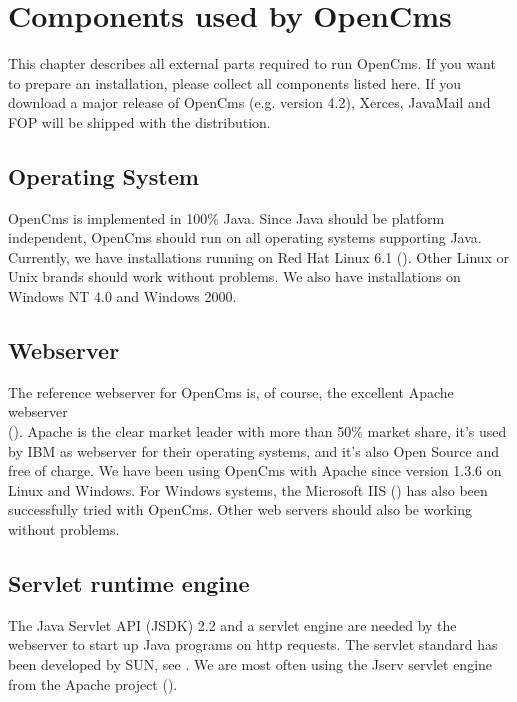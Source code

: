 \chapter{Components used by OpenCms}
\label{components}

This chapter describes all external parts required to run OpenCms.
If you want to prepare an installation, please collect all components listed here.
If you download a major release of OpenCms (e.g. version 4.2),
Xerces, JavaMail and FOP will be shipped with the distribution.

\section{Operating System}      
OpenCms is implemented in 100\% Java. Since Java should be platform independent, OpenCms should run 
on all operating systems supporting Java. Currently, we have installations running on 
Red Hat Linux 6.1 (). Other 
Linux or Unix brands should work without problems. We also have installations on 
Windows NT 4.0 and Windows 2000.   

\section{Webserver}
The reference webserver for OpenCms is, of course, the excellent Apache webserver \\
(). 
Apache is the clear market leader with more than 50\% market share, 
it's used by IBM as webserver for their operating systems, and it's also Open Source and 
free of charge. We have been using OpenCms with Apache since version 1.3.6 on Linux and Windows. 
For Windows systems, the Microsoft IIS ()
has also been successfully tried with OpenCms. Other web servers should also be working without problems.

\section{Servlet runtime engine}
The Java Servlet API (JSDK) 2.2 and a servlet engine are needed by the webserver 
to start up Java programs on http requests. 
The servlet standard has been developed by SUN, see 
.
We are most often using the Jserv servlet engine from
the Apache project (). 

